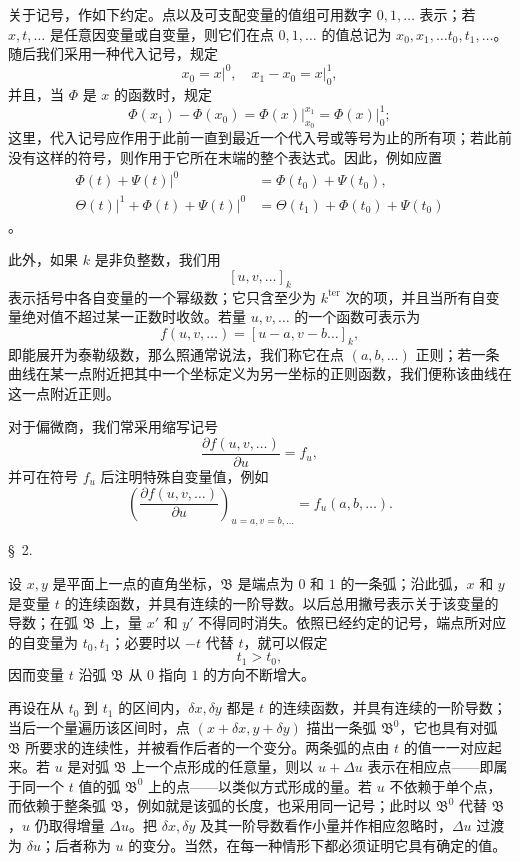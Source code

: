 \documentclass[11pt,a4paper,leqno]{article}
\begin{document}
关于记号，作如下约定。点以及可支配变量的值组可用数字 $0,1,\ldots$ 表示；若 $x,t,\ldots$ 是任意因变量或自变量，则它们在点 $0,1,\ldots$ 的值总记为 $x_0,x_1,\ldots t_0,t_1,\ldots$。随后我们采用一种代入记号，规定
\[
 x_0=\left.x\right|^{0},\quad x_1-x_0=\left.x\right|_{0}^{1},
\]
并且，当 $\Phi$ 是 $x$ 的函数时，规定
\[
 \Phi(x_1)-\Phi(x_0)=\left.\Phi(x)\right|_{x_0}^{x_1}=\left.\Phi(x)\right|_{0}^{1};
\]
这里，代入记号应作用于此前一直到最近一个代入号或等号为止的所有项；若此前没有这样的符号，则作用于它所在末端的整个表达式。因此，例如应置
\[
\begin{aligned}
 \left.\Phi(t)+\Psi(t)\right|^0&=\Phi(t_0)+\Psi(t_0),\\
 \left.\Theta(t)\right|^1+\left.\Phi(t)+\Psi(t)\right|^0&=\Theta(t_1)+\Phi(t_0)+\Psi(t_0)
\end{aligned}
\]
。

此外，如果 $k$ 是非负整数，我们用
\[
 [u,v,\ldots]_k
\]
表示括号中各自变量的一个幂级数；它只含至少为 $k^{\mathrm{ter}}$ 次的项，并且当所有自变量绝对值不超过某一正数时收敛。若量 $u,v,\ldots$ 的一个函数可表示为
\[
 f(u,v,\ldots)=[u-a,v-b\ldots]_k,
\]
即能展开为泰勒级数，那么照通常说法，我们称它在点 $(a,b,\ldots)$ 正则；若一条曲线在某一点附近把其中一个坐标定义为另一坐标的正则函数，我们便称该曲线在这一点附近正则。

对于偏微商，我们常采用缩写记号
\[
 \frac{\partial f(u,v,\ldots)}{\partial u}=f_u,
\]
并可在符号 $f_u$ 后注明特殊自变量值，例如
\[
 \left(\frac{\partial f(u,v,\ldots)}{\partial u}\right)_{u=a,v=b,\ldots}=f_u(a,b,\ldots).
\]

\begin{center}{\large \S~2.}\end{center}

设 $x,y$ 是平面上一点的直角坐标，$\mathfrak{B}$ 是端点为 $0$ 和 $1$ 的一条弧；沿此弧，$x$ 和 $y$ 是变量 $t$ 的连续函数，并具有连续的一阶导数。以后总用撇号表示关于该变量的导数；在弧 $\mathfrak{B}$ 上，量 $x'$ 和 $y'$ 不得同时消失。依照已经约定的记号，端点所对应的自变量为 $t_0,t_1$；必要时以 $-t$ 代替 $t$，就可以假定
\[
 t_1>t_0,
\]
因而变量 $t$ 沿弧 $\mathfrak{B}$ 从 $0$ 指向 $1$ 的方向不断增大。

再设在从 $t_0$ 到 $t_1$ 的区间内，$\delta x,\delta y$ 都是 $t$ 的连续函数，并具有连续的一阶导数；当后一个量遍历该区间时，点 $(x+\delta x,y+\delta y)$ 描出一条弧 $\mathfrak{B}^0$，它也具有对弧 $\mathfrak{B}$ 所要求的连续性，并被看作后者的一个变分。两条弧的点由 $t$ 的值一一对应起来。若 $u$ 是对弧 $\mathfrak{B}$ 上一个点形成的任意量，则以 $u+\Delta u$ 表示在相应点——即属于同一个 $t$ 值的弧 $\mathfrak{B}^0$ 上的点——以类似方式形成的量。若 $u$ 不依赖于单个点，而依赖于整条弧 $\mathfrak{B}$，例如就是该弧的长度，也采用同一记号；此时以 $\mathfrak{B}^0$ 代替 $\mathfrak{B}$，$u$ 仍取得增量 $\Delta u$。把 $\delta x,\delta y$ 及其一阶导数看作小量并作相应忽略时，$\Delta u$ 过渡为 $\delta u$；后者称为 $u$ 的变分。当然，在每一种情形下都必须证明它具有确定的值。
\end{document}

